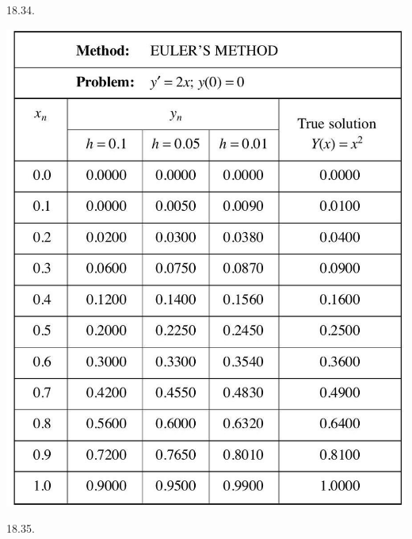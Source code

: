 \documentclass[10pt]{article}
\begin{document}
18.34.

\begin{center}
\includegraphics[max width=\textwidth]{2024_04_03_5bb5b4275a64cb9887d1g-375(1)}
\end{center}

18.35.
\end{document}
